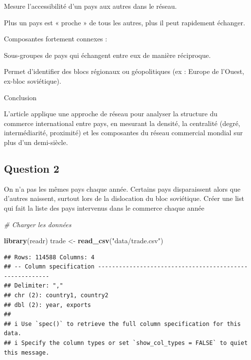\documentclass[
]{article}
\newenvironment{Shaded}{\begin{snugshade}}{\end{snugshade}}
\newcommand{\CommentTok}[1]{\textcolor[rgb]{0.56,0.35,0.01}{\textit{#1}}}
\newcommand{\DecValTok}[1]{\textcolor[rgb]{0.00,0.00,0.81}{#1}}
\newcommand{\FunctionTok}[1]{\textcolor[rgb]{0.13,0.29,0.53}{\textbf{#1}}}
\newcommand{\NormalTok}[1]{#1}
\newcommand{\OtherTok}[1]{\textcolor[rgb]{0.56,0.35,0.01}{#1}}
\newcommand{\SpecialCharTok}[1]{\textcolor[rgb]{0.81,0.36,0.00}{\textbf{#1}}}
\newcommand{\StringTok}[1]{\textcolor[rgb]{0.31,0.60,0.02}{#1}}
\begin{document}
Mesure l'accessibilité d'un pays aux autres dans le réseau.

Plus un pays est « proche » de tous les autres, plus il peut rapidement
échanger.

Composantes fortement connexes :

Sous-groupes de pays qui échangent entre eux de manière réciproque.

Permet d'identifier des blocs régionaux ou géopolitiques (ex : Europe de
l'Ouest, ex-bloc soviétique).

Conclusion

L'article applique une approche de réseau pour analyser la structure du
commerce international entre pays, en mesurant la densité, la centralité
(degré, intermédiarité, proximité) et les composantes du réseau
commercial mondial sur plus d'un demi-siècle.

\subsection{Question 2}\label{question-2}

On n'a pas les mêmes pays chaque année. Certains pays disparaissent
alors que d'autres naissent, surtout lors de la dislocation du bloc
soviétique. Créer une list qui fait la liste des pays intervenus dans le
commerce chaque année

\begin{Shaded}
\begin{Highlighting}[]
\CommentTok{\# Charger les données}

\FunctionTok{library}\NormalTok{(readr)}
\NormalTok{trade }\OtherTok{\textless{}{-}} \FunctionTok{read\_csv}\NormalTok{(}\StringTok{"data/trade.csv"}\NormalTok{)}
\end{Highlighting}
\end{Shaded}

\begin{verbatim}
## Rows: 114588 Columns: 4
## -- Column specification --------------------------------------------------------
## Delimiter: ","
## chr (2): country1, country2
## dbl (2): year, exports
## 
## i Use `spec()` to retrieve the full column specification for this data.
## i Specify the column types or set `show_col_types = FALSE` to quiet this message.
\end{verbatim}

\begin{Shaded}
\end{Shaded}
\end{document}
